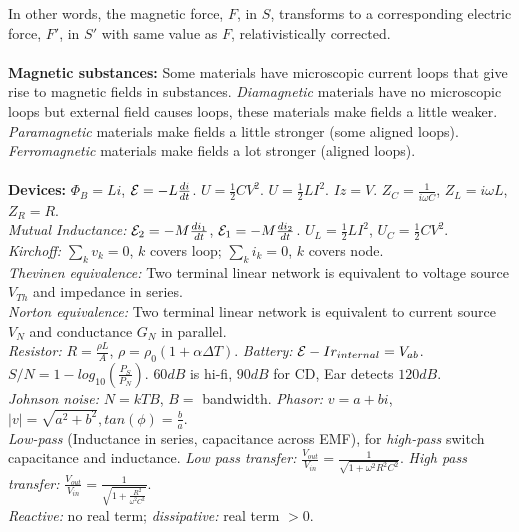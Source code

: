 In other words, the magnetic force, $F$, in $S$, transforms to a corresponding electric force, $F'$, in $S'$ 
with same value as $F$, relativistically corrected.
\\
\\
{\bf Magnetic substances:}  Some materials have microscopic current loops that give rise to magnetic
fields in substances. 
\emph{Diamagnetic} materials have no microscopic loops but external field causes loops, these materials make
fields a little weaker.
\emph{Paramagnetic} 
materials make fields a little stronger (some aligned loops).
\emph{Ferromagnetic} 
materials make fields a lot stronger (aligned loops).
\\
\\
{\bf Devices:}
$\Phi_B= Li$,
${\cal E} = -L {\frac {d i} {dt}}$.  
$U= {\frac 1 2} C V^2$.
$U= {\frac 1 2} L I^2$.
$Iz=V$. $Z_C= {\frac  1 {i \omega C}}$, $Z_L= i \omega L$, $Z_R= R$. \\
\emph{Mutual Inductance:}
${\cal E}_2 = -M {\frac {d i_1} {dt}}$,  
${\cal E}_1 = -M {\frac {d i_2} {dt}}$.  
$U_L= {\frac 1 2} L I^2$,
$U_C= {\frac 1 2} C V^2$.
\\
\emph{Kirchoff:}
$\sum_{k} v_k=0$, $k$ covers loop; 
$\sum_{k} i_k=0$, $k$ covers node. \\
\emph{Thevinen equivalence:}
Two terminal linear network is equivalent to voltage source $V_{Th}$ and
impedance in series.  \\
\emph{Norton equivalence:} Two terminal linear network is equivalent to current 
source $V_{N}$ and conductance $G_N$ in parallel. \\
\emph{Resistor:} $R= {\frac {\rho L} A}$, $\rho= \rho_0(1+ \alpha \Delta T)$.
\emph{Battery:} ${\cal E} - Ir_{internal}= V_{ab}$. \\
$S/N= 1- log_{10}({\frac {P_S} {P_N}})$.  $60 dB$ is hi-fi, $90 dB$ for CD, Ear
detects $120 dB$. \\
\emph{Johnson noise:} $N=kTB$, $B=$ bandwidth.
\emph{Phasor:} $v=a+bi$, $|v|= \sqrt{a^2+b^2}, tan(\phi)= {\frac b a}$. \\
\emph{Low-pass} (Inductance in series, capacitance across EMF), 
for \emph{high-pass} switch capacitance and inductance. 
\emph{Low pass transfer:} ${\frac {V_{out}} {V_{in}}} = {\frac 1 {\sqrt{1+ \omega^2 R^2 C^2}}}$.
\emph{High pass transfer:} 
${\frac {V_{out}} {V_{in}}} = {\frac 1 {\sqrt{1+ {\frac {R^2} {\omega^2 C^2}}}}}$. \\
\emph{Reactive:} no real term;
\emph{dissipative:} real term $>0$.  \\
